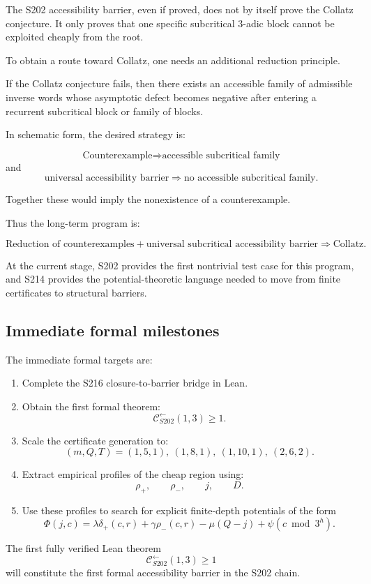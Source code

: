 The S202 accessibility barrier, even if proved, does not by itself prove
the Collatz conjecture. It only proves that one specific subcritical
\(3\)-adic block cannot be exploited cheaply from the root.

To obtain a route toward Collatz, one needs an additional reduction
principle.

\begin{conjecture}
\label{conj:subcritical-reduction}
If the Collatz conjecture fails, then there exists an accessible family of
admissible inverse words whose asymptotic defect becomes negative after
entering a recurrent subcritical block or family of blocks.
\end{conjecture}

In schematic form, the desired strategy is:

\[
\boxed{
\text{Counterexample}
\Longrightarrow
\text{accessible subcritical family}
}
\]
and
\[
\boxed{
\text{universal accessibility barrier}
\Longrightarrow
\text{no accessible subcritical family}.
}
\]

Together these would imply the nonexistence of a counterexample.

Thus the long-term program is:

\[
\boxed{
\text{Reduction of counterexamples}
+
\text{universal subcritical accessibility barrier}
\Longrightarrow
\text{Collatz}.
}
\]

At the current stage, S202 provides the first nontrivial test case for this
program, and S214 provides the potential-theoretic language needed to move
from finite certificates to structural barriers.

\subsection{Immediate formal milestones}
\label{subsec:S214-formal-milestones}

The immediate formal targets are:

\begin{enumerate}
    \item Complete the S216 closure-to-barrier bridge in Lean.
    \item Obtain the first formal theorem:
    \[
    \mathcal C^{\leftarrow}_{S202}(1,3)\ge1.
    \]
    \item Scale the certificate generation to:
    \[
    (m,Q,T)=(1,5,1),\ (1,8,1),\ (1,10,1),\ (2,6,2).
    \]
    \item Extract empirical profiles of the cheap region using:
    \[
    \rho_+,\qquad \rho_-,\qquad j,\qquad D.
    \]
    \item Use these profiles to search for explicit finite-depth potentials
    of the form
    \[
    \Phi(j,c)
    =
    \lambda\delta_+(c,r)
    +
    \gamma\rho_-(c,r)
    -
    \mu(Q-j)
    +
    \psi(c\bmod3^h).
    \]
\end{enumerate}

The first fully verified Lean theorem
\[
\mathcal C^{\leftarrow}_{S202}(1,3)\ge1
\]
will constitute the first formal accessibility barrier in the S202 chain.
